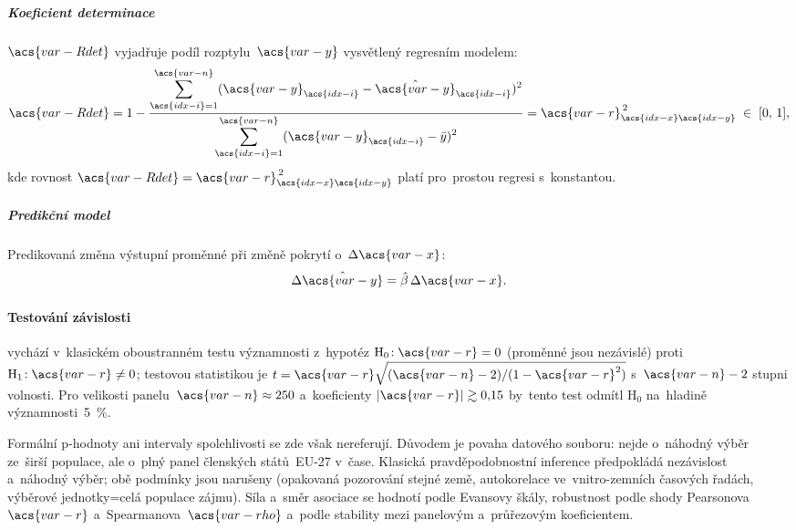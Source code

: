 \subparagraph{Koeficient determinace}\label{spar:r2}

$\acs{var-Rdet}$ vyjadřuje podíl rozptylu~$\acs{var-y}$ vysvětlený regresním modelem:
\begin{equation}\label{eq:r2}
  \acs{var-Rdet}
  = 1 - \frac{\displaystyle\sum_{\acs{idx-i}=1}^{\acs{var-n}}
             (\acs{var-y}_{\acs{idx-i}} - \hat{\acs{var-y}}_{\acs{idx-i}})^{2}}
             {\displaystyle\sum_{\acs{idx-i}=1}^{\acs{var-n}}
                (\acs{var-y}_{\acs{idx-i}} - \bar{y})^{2}}
  = \acs{var-r}_{\acs{idx-x}\acs{idx-y}}^{\,2} \;\in\; [0,\,1],
\end{equation}
kde rovnost $\acs{var-Rdet} = \acs{var-r}_{\acs{idx-x}\acs{idx-y}}^{\,2}$ platí pro~prostou regresi s~konstantou.

\subparagraph{Predikční model}\label{spar:pred}

Predikovaná změna výstupní proměnné při změně pokrytí o~$\Delta \acs{var-x}$:
\begin{equation}\label{eq:delta_pred}
  \Delta\hat{\acs{var-y}} = \hat{\beta}\,\Delta \acs{var-x}.
\end{equation}

\paragraph{Testování závislosti}\label{par:testovani} vychází v~klasickém oboustranném testu významnosti z~hypotéz
\(\mathrm{H}_{0}\!:\acs{var-r}=0\) (proměnné jsou nezávislé) proti
\(\mathrm{H}_{1}\!:\acs{var-r}\neq 0\); testovou statistikou je
\(t = \acs{var-r}\sqrt{(\acs{var-n}-2)/(1-\acs{var-r}^{2})}\)
s~$\acs{var-n}-2$ stupni volnosti.
Pro velikosti panelu~$\acs{var-n} \approx 250$ a~koeficienty $|\acs{var-r}| \gtrsim 0{,}15$
by~tento test odmítl $\mathrm{H}_{0}$ na~hladině významnosti~\SI{5}{\percent}.

Formální p-hodnoty ani intervaly spolehlivosti se zde však nereferují.
Důvodem je povaha datového souboru: nejde o~náhodný výběr ze~širší populace,
ale o~plný panel členských států~EU-27 v~čase. Klasická pravděpodobnostní
inference předpokládá nezávislost a~náhodný výběr; obě podmínky jsou narušeny
(opakovaná pozorování stejné země, autokorelace ve~vnitro-zemních časových
řadách, výběrové jednotky=celá populace zájmu). Síla a~směr asociace se hodnotí podle Evansovy škály,
robustnost podle shody Pearsonova~$\acs{var-r}$ a~Spearmanova~$\acs{var-rho}$
a~podle stability mezi panelovým a~průřezovým koeficientem.

